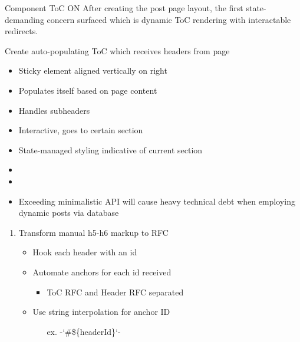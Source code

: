 \documentclass[7px]{article}
\begin{document}
\frontmatter
{Component}
{ToC}
{ON}
{After creating the post page layout, the first state-demanding concern surfaced which is dynamic ToC rendering with interactable redirects.}

\strategy
{
  Create auto-populating ToC which receives headers from page
}
{
  \begin{enumerate}
      \small
      \begin{itemize}[label=$\multimapdotinv$, leftmargin=1.7mm]
        \item Sticky element aligned vertically on right
        \item Populates itself based on page content
        \item Handles subheaders
        \item Interactive, goes to certain section
        \item State-managed styling indicative of current section
      \end{itemize}
      \normalsize
  \end{enumerate}
}
{
  \small
  \begin{itemize}[label=$\multimapdotinv$]
    \item {}
    \item {}
  \end{itemize}
  \normalsize
}
{
  \small
  \begin{itemize}[label=\blitzb]
    \item Exceeding minimalistic API will cause heavy technical debt when employing dynamic posts via database
  \end{itemize}
  \normalsize
}

\deploy
{
  \small
  \begin{enumerate}[label=$\multimapinv$]
    \item Transform manual h5-h6 markup to RFC
      \begin{itemize}[label=$\multimapdot$, leftmargin=1.7mm]
        \item Hook each header with an id
        \item Automate anchors for each id received
          \begin{itemize}
            \item ToC RFC and Header RFC separated
          \end{itemize}
        \item Use string interpolation for anchor ID
        \begin{itemize}
          \item[ex.] -`\#\$\{headerId\}`-
        \end{itemize}
    \end{itemize}
  \end{enumerate}
  \normalsize
}
{

}

\end{document}
